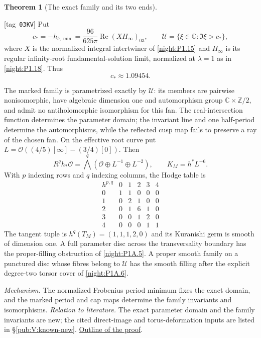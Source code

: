 \documentclass[11pt,a4paper]{article}
\numberwithin{equation}{section}
\theoremstyle{definition}
\newcommand{\C}{\mathbb C}\newcommand{\R}{\mathbb R}\newcommand{\Z}{\mathbb Z}\newcommand{\Q}{\mathbb Q}\newcommand{\N}{\mathbb N}\newcommand{\F}{\mathbb F}
\newcommand{\OO}{\mathcal O}\newcommand{\cO}{\mathcal O}\newcommand{\cM}{\mathcal M}\newcommand{\cF}{\mathcal F}
\newtheorem{maintheorem}{Theorem}
\newcommand{\StatementRecord}[4]{{\upshape\footnotesize[tag~\texttt{#3}]}\enspace\ignorespaces}
\begin{document}
\hypertarget{main-V-E}{}
\begin{maintheorem}[The exact family and its two ends]
\hypertarget{tag-03KV}{}\label{series:V:E}
\StatementRecord{series:V:E}{proved}{03KV}{\cref{night:P1.18}, \cref{night:P1A.1}, \cref{night:P1A.2}, \cref{night:P1A.3}, \cref{night:P1A.4}, \cref{night:P1A.5}, \cref{night:P1.17}, \cref{night:P1A.6}}
Put
\[
 c_*=-h_{b,\min}=\frac{96}{625\pi}\operatorname{Re}(XH_\infty)_{03},
 \qquad \mathcal U=\{\xi\in\C:\Im\xi>c_*\},
\]
where $X$ is the normalized integral intertwiner of
\cref{night:P1.15} and $H_\infty$ is its regular infinity-root
fundamental-solution limit, normalized at $\lambda=1$ as in
\cref{night:P1.18}. Thus
\[c_*\approx1.09454.\]

The marked family is parametrized exactly by $\mathcal U$:
its members are pairwise nonisomorphic, have algebraic dimension one
and automorphism group $\mathbb C\times\mathbb Z/2$, and admit no
antiholomorphic isomorphism for this fan.  The real-intersection
function determines the parameter domain; the invariant line and
one half-period determine the automorphisms, while the reflected cusp map fails to preserve a ray of the chosen fan.
On the effective root curve put
$L=\OO((4/5)[\infty]-(3/4)[0])$. Then
\[
 R^qh_*\OO=\bigwedge^q(\OO\oplus L^{-1}\oplus L^{-2}),
 \qquad K_M=h^*L^{-6}.
\]
With $p$ indexing rows and $q$ indexing columns, the Hodge table is
\[
\begin{array}{c|ccccc}
h^{p,q}&0&1&2&3&4\\\hline
0&1&1&0&0&0\\
1&0&2&1&0&0\\
2&0&1&6&1&0\\
3&0&0&1&2&0\\
4&0&0&0&1&1
\end{array}
\]
The tangent tuple is $h^q(T_M)=(1,1,1,2,0)$ and its Kuranishi germ
is smooth of dimension one. A full parameter disc across the
transversality boundary has the proper-filling obstruction of
\cref{night:P1A.5}. A proper smooth family on a punctured disc
whose fibres belong to $\mathcal U$ has the smooth filling after
the explicit degree-two torsor cover of \cref{night:P1A.6}.


\end{maintheorem}

\textit{Mechanism.} The normalized Frobenius period minimum fixes the exact domain, and the marked period and cap maps determine the family invariants and isomorphisms.
\textit{Relation to literature.} The exact parameter domain and the family invariants are new; the cited direct-image and torus-deformation inputs are listed in \S\ref{pub:V:known-new}.
\hyperlink{outline-V-E}{Outline of the proof}.
\end{document}
